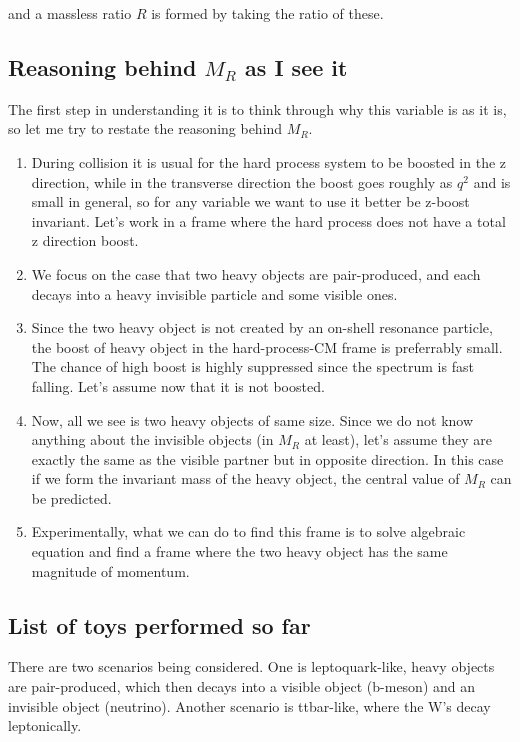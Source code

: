 \documentclass{fheadnote}
\begin{document}
and a massless ratio $R$ is formed by taking the ratio of these.


\subsection{Reasoning behind $M_R$ as I see it}

The first step in understanding it is to think through why this variable is as it is, so let me try to restate the reasoning behind $M_R$.

\begin{enumerate}
\item During collision it is usual for the hard process system to be boosted in the z direction, while in the transverse direction the boost goes roughly as $q^2$ and is small in general,
so for any variable we want to use it better be z-boost invariant.  Let's work in a frame where the hard process does not have a total z direction boost.
\item We focus on the case that two heavy objects are pair-produced, and each decays into a heavy invisible particle and some visible ones.
\item Since the two heavy object is not created by an on-shell resonance particle, the boost of heavy object in the hard-process-CM frame is preferrably small.
The chance of high boost is highly suppressed since the spectrum is fast falling.  Let's assume now that it is not boosted.
\item Now, all we see is two heavy objects of same size.  Since we do not know anything about the invisible objects (in $M_R$ at least), let's assume they are exactly the same as the visible partner but
in opposite direction.  In this case if we form the invariant mass of the heavy object, the central value of $M_R$ can be predicted.
\item Experimentally, what we can do to find this frame is to solve algebraic equation and find a frame where the two heavy object has the same magnitude of momentum.
\end{enumerate}


\subsection{List of toys performed so far}

There are two scenarios being considered.  One is leptoquark-like, heavy objects are pair-produced, which then decays into a visible object (b-meson) and an invisible object (neutrino).
Another scenario is ttbar-like, where the W's decay leptonically.
\end{document}
